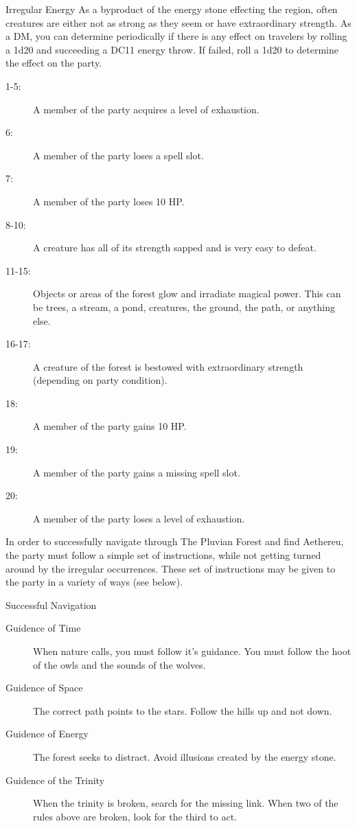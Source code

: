 \documentclass[letterpaper,10pt,twoside,twocolumn,openany]{book}
\begin{document}
\begin{commentbox}{Irregular Energy}
	As a byproduct of the energy stone effecting the region, often creatures are either not as strong as they seem or have extraordinary strength. As a DM, you can determine periodically if there is any effect on travelers by rolling a 1d20 and succeeding a DC11 energy throw. If failed, roll a 1d20 to determine the effect on the party.
	\hline
	\begin{description}
		\item[1-5:] A member of the party acquires a level of exhaustion.
		\item[6:] A member of the party loses a spell slot.
		\item[7:] A member of the party loses 10 HP.
		\item[8-10:] A creature has all of its strength sapped and is very easy to defeat.
		\item[11-15:] Objects or areas of the forest glow and irradiate magical power. This can be trees, a stream, a pond, creatures, the ground, the path, or anything else. 
		\item[16-17:] A creature of the forest is bestowed with extraordinary strength (depending on party condition).
		\item[18:] A member of the party gains 10 HP. 
		\item[19:] A member of the party gains a missing spell slot. 
		\item[20:] A member of the party loses a level of exhaustion.
	\end{description}
\end{commentbox}

In order to successfully navigate through The Pluvian Forest and find Aethereu, the party must follow a simple set of instructions, while not getting turned around by the irregular occurrences. These set of instructions may be given to the party in a variety of ways (see below). 

\begin{commentbox}{Successful Navigation}
	\begin{description}
		\item[Guidence of Time] When nature calls, you must follow it's guidance. You must follow the hoot of the owls and the sounds of the wolves.
		\item[Guidence of Space] The correct path points to the stars. Follow the hills up and not down.
		\item[Guidence of Energy] The forest seeks to distract. Avoid illusions created by the energy stone.
		\item[Guidence of the Trinity] When the trinity is broken, search for the missing link. When two of the rules above are broken, look for the third to act.
	\end{description}
\end{commentbox}
\end{document}
